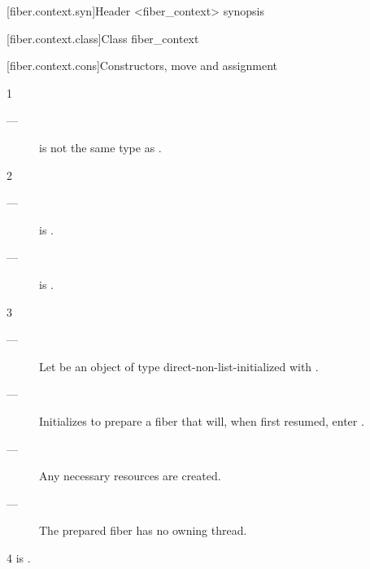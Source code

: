 [fiber.context.syn]{Header <fiber\_context> synopsis}


[fiber.context.class]{Class fiber\_context}


\newcommand{\state}{\cpp{state}}

[fiber.context.cons]{Constructors, move and assignment}


1 \constraints
\begin{description}
    \item[---]  is not the same type as \fiber.
\end{description}

2 \mandates
\begin{description}
    \item[---]  is \true.
    \item[---]  is \true.
\end{description}

3 \effects
\begin{description}
    \item[---] Let  be an object of
               type  direct-non-list-initialized
               with . 
    \item[---] Initializes  to prepare a fiber that will, when
               first resumed, enter .
    \item[---] Any necessary resources are created. 
    \item[---] The prepared fiber has no owning thread.
\end{description}

4 \postcond
\emptyfn is \false.

